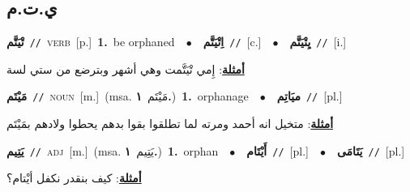 \documentclass[10pt,a4paper,twoside]{article} %
\begin{document}
\begin{multicols}{2}
\vspace{-3mm}
\subsection*{\color{blue}\foreignlanguage{arabic}{ي.ت.م}\color{blue}{}} 

{\setlength\topsep{0pt}\textbf{\foreignlanguage{arabic}{تْيَتَّم}}\ {\color{gray}\texttt{//}\color{black}}\ \textsc{verb}\ [p.]\ \textbf{1.}~be orphaned\ \ $\bullet$\ \ \setlength\topsep{0pt}\textbf{\foreignlanguage{arabic}{اِتْيَتَّم}}\ {\color{gray}\texttt{//}\color{black}}\ [c.]\ \ $\bullet$\ \ \setlength\topsep{0pt}\textbf{\foreignlanguage{arabic}{يِتْيَتَّم}}\ {\color{gray}\texttt{//}\color{black}}\ [i.]\  \begin{flushright}\color{gray}\foreignlanguage{arabic}{\textbf{\underline{\foreignlanguage{arabic}{أمثلة}}}: إِمي تْيَتَّمت وهي أشهر وبترضع من ستي لسة}\end{flushright}\color{black}} \vspace{2mm}

{\setlength\topsep{0pt}\textbf{\foreignlanguage{arabic}{مَيْتَم}}\ {\color{gray}\texttt{//}\color{black}}\ \textsc{noun}\ [m.]\ \color{gray}(msa. \foreignlanguage{arabic}{مَيْتَم}~\foreignlanguage{arabic}{\textbf{١.}})\color{black}\ \textbf{1.}~orphanage\ \ $\bullet$\ \ \setlength\topsep{0pt}\textbf{\foreignlanguage{arabic}{ميَاتِم}}\ {\color{gray}\texttt{//}\color{black}}\ [pl.]\  \begin{flushright}\color{gray}\foreignlanguage{arabic}{\textbf{\underline{\foreignlanguage{arabic}{أمثلة}}}: متخيل انه أحمد ومرته لما تطلقوا بقوا بدهم يحطوا ولادهم بمَيْتَم}\end{flushright}\color{black}} \vspace{2mm}

{\setlength\topsep{0pt}\textbf{\foreignlanguage{arabic}{يَتِيم}}\ {\color{gray}\texttt{//}\color{black}}\ \textsc{adj}\ [m.]\ \color{gray}(msa. \foreignlanguage{arabic}{يَتِيم}~\foreignlanguage{arabic}{\textbf{١.}})\color{black}\ \textbf{1.}~orphan\ \ $\bullet$\ \ \setlength\topsep{0pt}\textbf{\foreignlanguage{arabic}{أَيْتَام}}\ {\color{gray}\texttt{//}\color{black}}\ [pl.]\ \ $\bullet$\ \ \setlength\topsep{0pt}\textbf{\foreignlanguage{arabic}{يَتَامَى}}\ {\color{gray}\texttt{//}\color{black}}\ [pl.]\  \begin{flushright}\color{gray}\foreignlanguage{arabic}{\textbf{\underline{\foreignlanguage{arabic}{أمثلة}}}: كيف بنقدر نكفل أيْتام؟}\end{flushright}\color{black}} \vspace{2mm}


\end{multicols}
\end{document}
